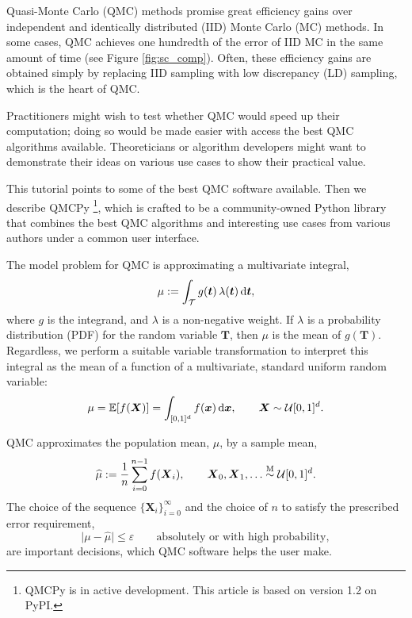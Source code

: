 \documentclass[graybox]{svmult}
\begin{document}
Quasi-Monte Carlo (QMC) methods promise great efficiency gains over independent and identically distributed (IID) Monte Carlo (MC) methods.  In some cases, QMC  achieves one hundredth of the error of IID MC in the same amount of time (see Figure \ref{fig:sc_comp}). Often, these efficiency gains are obtained simply by replacing IID sampling with low discrepancy (LD) sampling, which is the heart of QMC. 

Practitioners might wish to test whether QMC would speed up their computation; doing so would be made easier with access the best QMC algorithms available.  Theoreticians or algorithm developers might want to demonstrate their ideas on various use cases to show their practical value.  

This tutorial points to some of the best QMC software available.  Then we describe  QMCPy \cite{QMCPy2020a}\footnote{QMCPy is in active development. This article is based on version 1.2 on PyPI.}, which is crafted to be a community-owned Python library that combines the best QMC algorithms and interesting use cases from various authors under a common user interface.

The model problem for QMC is approximating a multivariate integral,
\begin{equation} \label{eq:integral}
	\mu := \int_\mathcal{T} g(\boldsymbol{t}) \, \lambda(\boldsymbol{t}) \, \D \boldsymbol{t},
\end{equation}
where $g$ is the integrand, and $\lambda$ is a non-negative weight.  If $\lambda$ is a probability distribution (PDF) for the random variable $\boldsymbol{T}$, then $\mu$ is the mean of $g(\boldsymbol{T})$.  Regardless, we perform a suitable variable transformation to interpret this integral as the  mean of a function of a multivariate, standard uniform random variable:
\begin{equation} \label{eq:fintegral}
	\mu = \mathbb{E}[f(\boldsymbol{X})] =  \int_{[0,1]^d}  f(\boldsymbol{x}) \,  \D \boldsymbol{x} , \qquad \boldsymbol{X} \sim \mathcal{U}[0,1]^d.
\end{equation}

QMC approximates the population mean, $\mu$,  by a sample mean,
\begin{equation} \label{eq:samplemean}
	\widehat{\mu} := \frac 1n \sum_{i=0}^{n-1} f(\boldsymbol{X}_i), \qquad \boldsymbol{X}_0, \boldsymbol{X}_1, \ldots \overset{\textup{M}}{\sim} \mathcal{U}[0,1]^d.
\end{equation}
The choice of the sequence $\{\boldsymbol{X}_i\}_{i=0}^\infty$ and the choice of $n$ to satisfy  the prescribed error requirement,
\begin{equation} \label{eq:err_req}
	\lvert\mu - \widehat{\mu}\rvert \le \varepsilon \qquad \text{absolutely or with high probability},
\end{equation} 
are important decisions, which  QMC software helps the user make.
\end{document}
